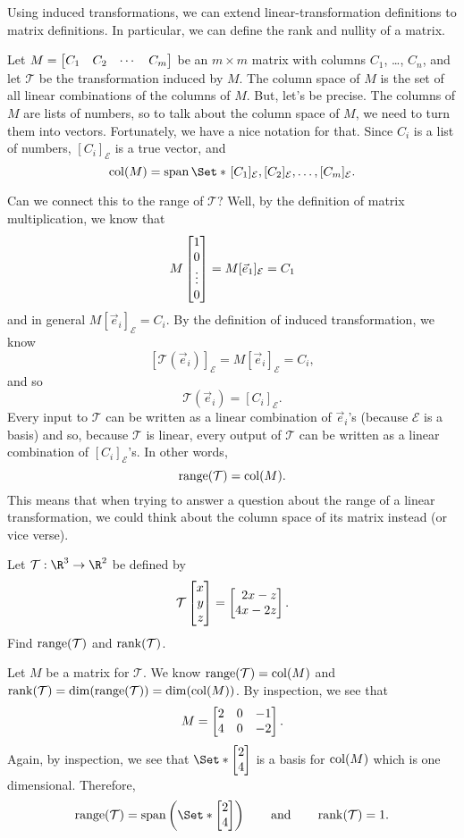 Using induced transformations, we can extend linear-transformation definitions to matrix definitions.
In particular, we can define the rank and nullity of a matrix.


Let $M=\mat{C_1&C_2&\cdots &C_m}$ be an $m\times m$ matrix with columns $C_1$, \ldots, $C_n$, and let $\mathcal T$ be 
the transformation induced by $M$. The column space of $M$ is the set of all linear combinations of the columns of
$M$. But, let's be precise. The columns of $M$ are lists of numbers, so to talk about the column space of $M$,
we need to turn them into vectors. Fortunately, we have a nice notation for that. Since $C_i$ is a list of numbers,
$[C_i]_{\mathcal E}$ is a true vector, and
\[
	\Col(M)=\Span\Set*{\hspace{1pt}[C_1]_{\mathcal E},[C_2]_{\mathcal E},\ldots,[C_m]_{\mathcal E}}.
\]

Can we connect this to the range of $\mathcal T$? Well, by the definition of matrix multiplication, we know that
\[
	M\begin{bmatrix}1\\0\\\vdots\\0\end{bmatrix}=M[\vec e_1]_{\mathcal E} = C_1
\]
and in general $M[\vec e_i]_{\mathcal E}=C_i$. By the definition of induced transformation, we know
\[
	[\mathcal T(\vec e_i)]_{\mathcal E} = M[\vec e_i]_{\mathcal E} = C_i,
\]
and so
\[
	\mathcal T(\vec e_i)= [C_i]_{\mathcal E}.
\]
Every input to $\mathcal T$ can be written as a linear combination of $\vec e_i$'s (because $\mathcal E$ is a basis)
and so, because $\mathcal T$ is linear, every output of $\mathcal T$ can be written as a linear combination of $[C_i]_{\mathcal E}$'s.
In other words,
\[
	\operatorname{range}(\mathcal T)=\operatorname{col}(M).
\]
This means that when trying to answer a question about the range of a linear transformation, we could think about
the column space of its matrix instead (or vice verse). 

\begin{example}
	Let $\mathcal T:\R^3\to\R^2$ be defined by
	\[
		\mathcal T\mat{x\\y\\z} = \mat{2x-z\\4x-2z}.
	\]
	Find $\operatorname{range}(\mathcal T)$ and $\operatorname{rank}(\mathcal T)$.

	Let $M$ be a matrix for $\mathcal T$. We know $\operatorname{range}(\mathcal T)=\operatorname{col}(M)$ and $\operatorname{rank}(\mathcal T)=\operatorname{dim}(\operatorname{range}(\mathcal T))
	=\operatorname{dim}(\operatorname{col}(M))$. By inspection, we see that
	\[
		M=\mat{2&0&-1\\4&0&-2}.
	\]
	Again, by inspection, we see that $\Set*{\mat{2\\4}}$ is a basis for $\operatorname{col}(M)$ which is one dimensional.
	Therefore,
	\[
		\Range(\mathcal T) = \Span\left(\Set*{\mat{2\\4}}\right)\qquad \text{and}\qquad \Rank(\mathcal T)=1.
	\]
\end{example}

